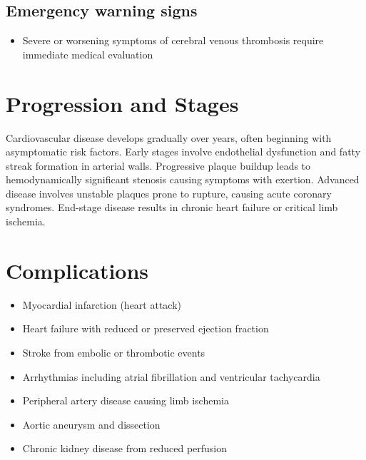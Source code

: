 \subsection{Emergency warning signs}
\begin{itemize}[noitemsep]
  \item Severe or worsening symptoms of cerebral venous thrombosis require immediate medical evaluation
\end{itemize}
\section{Progression and Stages}
Cardiovascular disease develops gradually over years, often beginning with asymptomatic risk factors. Early stages involve endothelial dysfunction and fatty streak formation in arterial walls. Progressive plaque buildup leads to hemodynamically significant stenosis causing symptoms with exertion. Advanced disease involves unstable plaques prone to rupture, causing acute coronary syndromes. End-stage disease results in chronic heart failure or critical limb ischemia.
\section{Complications}
\begin{itemize}[noitemsep]
  \item Myocardial infarction (heart attack)
  \item Heart failure with reduced or preserved ejection fraction
  \item Stroke from embolic or thrombotic events
  \item Arrhythmias including atrial fibrillation and ventricular tachycardia
  \item Peripheral artery disease causing limb ischemia
  \item Aortic aneurysm and dissection
  \item Chronic kidney disease from reduced perfusion
\end{itemize}
